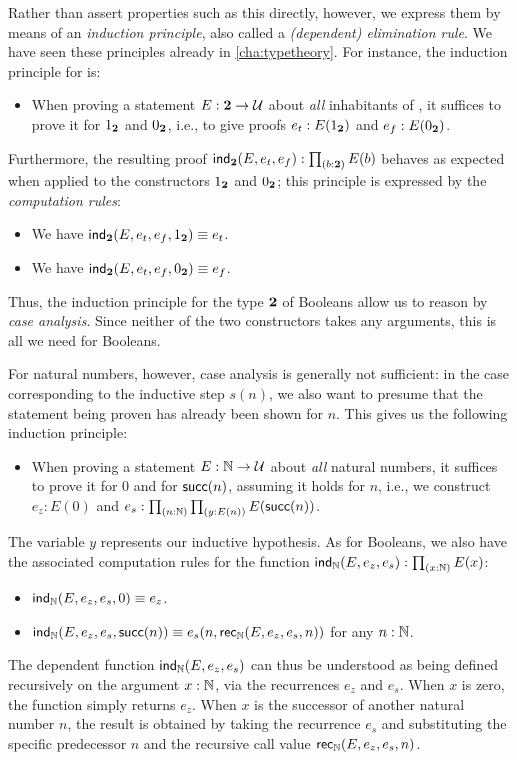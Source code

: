 %
Rather than assert properties such as this directly, however, we express them by means of an \emph{induction principle}, also called a \emph{(dependent) elimination rule}.
We have seen these principles already in \autoref{cha:typetheory}.
For instance, the induction principle for \bool is:
%
\begin{itemize}
\item When proving a statement $E : \mathbf{2} \to \mathcal{U}$ about \emph{all} inhabitants of \bool, it suffices to prove it for ${1_{\mathbf{2}}}$ and ${0_{\mathbf{2}}}$, i.e., to give proofs $ e_t : E({1_{\mathbf{2}}})$ and $e_f : E({0_{\mathbf{2}}})$.
\end{itemize}

%
Furthermore, the resulting proof $\ind\bool(E,e_t,e_f): \prd{b : \bool}E(b)$ behaves as expected when applied to the constructors ${1_{\mathbf{2}}}$ and ${0_{\mathbf{2}}}$; this principle is expressed by the \emph{computation rules}:
\begin{itemize}
\item We have $\mathsf{ind}_{\mathbf{2}}(E,e_t,e_f,{1_{\mathbf{2}}}) \equiv e_t$.
\item We have $\mathsf{ind}_{\mathbf{2}}(E,e_t,e_f,{0_{\mathbf{2}}}) \equiv e_f$.
\end{itemize}

Thus, the induction principle for the type $\mathbf{2}$ of Booleans allow us to reason by \emph{case analysis}.
Since neither of the two constructors takes any arguments, this is all we need for Booleans.

For natural numbers, however, case analysis is generally not sufficient: in the case corresponding to the inductive step $s(n)$, we also want to presume that the statement being proven has already been shown for $n$.
This gives us the following induction principle:
\begin{itemize}
\item When proving a statement $E : \mathbb{N} \to \mathcal{U}$ about \emph{all} natural numbers, it suffices to prove it for $0$ and for $\mathsf{succ}(n)$, assuming it holds
for $n$, i.e., we construct $e_z : E(0)$ and $e_s : \prd{n : \nat}{y : E(n)} E(\suc(n))$.
\end{itemize}
The variable
%
$y$ represents our inductive hypothesis.  As for Booleans, we also have the associated computation rules for the function $\ind\nat(E,e_z,e_s) : \prd{x:\nat} E(x)$:
\begin{itemize}
\item $\mathsf{ind}_{\mathbb{N}}(E,e_z,e_s,0) \equiv e_z$.
\item $\mathsf{ind}_{\mathbb{N}}(E,e_z,e_s,\mathsf{succ}(n)) \equiv e_s(n,\mathsf{rec}_{\mathbb{N}}(E,e_z,e_s,n))$ for any $n : \mathbb{N}$.
\end{itemize}
The dependent function $\mathsf{ind}_{\mathbb{N}}(E,e_z,e_s)$ can thus be understood as being defined recursively on the argument $x : \mathbb{N}$, via the recurrences $e_z$ and $e_s$.
When $x$ is zero, the function simply returns $e_z$.
When $x$ is the successor of another natural number $n$, the result is obtained by taking the recurrence $e_s$ and substituting the specific predecessor $n$ and the recursive call value $\mathsf{rec}_{\mathbb{N}}(E,e_z,e_s,n)$.

